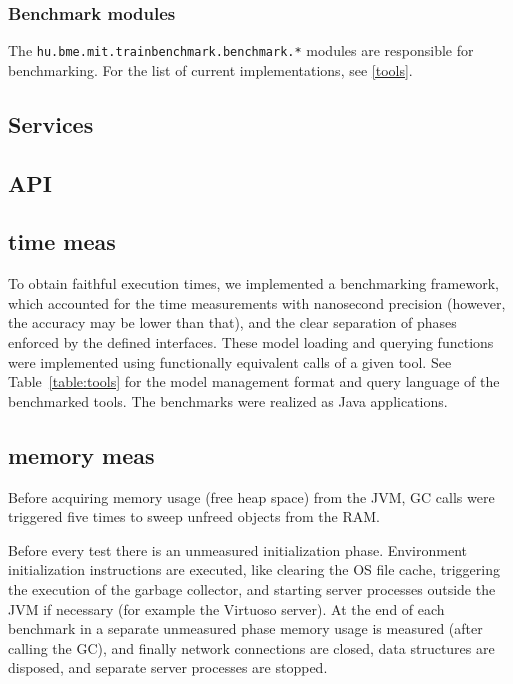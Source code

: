 \subsubsection{Benchmark modules}

The \texttt{hu.bme.mit.trainbenchmark.benchmark.*} modules are responsible for benchmarking. For the list of current implementations, see \ref{tools}.


\subsection{Services}

\subsection{API}

\subsection{time meas}

To obtain faithful execution times, we implemented a benchmarking framework,
which accounted for the time measurements with nanosecond precision (however, the accuracy may be lower than that),
 and the clear separation of phases enforced by the defined
interfaces. These model loading and querying functions were implemented using
functionally equivalent calls of a given tool. See Table~\ref{table:tools} for
the model management format and query language of the benchmarked tools. The
benchmarks were realized as Java applications.

\subsection{memory meas}
Before acquiring memory usage (free heap space) from the JVM, GC calls were triggered five times to sweep unfreed objects from the RAM.

Before every test
there is an unmeasured initialization phase. Environment initialization
instructions are executed, like clearing the OS file cache, triggering the
execution of the garbage collector, and starting server processes outside the
JVM if necessary (for example the Virtuoso server). At the end of each benchmark
in a separate unmeasured phase memory usage is measured (after calling the GC),
and finally network connections are closed, data structures are disposed, and
separate server processes are stopped.


